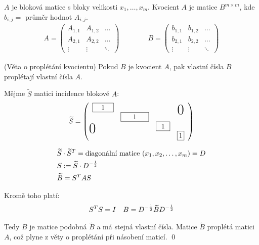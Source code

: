 \df $A$ je bloková matice s bloky velikosti $x_1, \dots, x_m$. Kvocient $A$ je matice $B^{m\times m}$, kde $b_{i,j} = $ průměr hodnot $A_{i,j}$.
\begin{align*}
	A = \left(\begin{matrix}
		A_{1,1} & A_{1,2} & \dots \\
		A_{2,1} & A_{2,2} & \dots \\
		\vdots & \vdots & \ddots 
		\end{matrix}\right)
	\qquad
	\qquad
	B = \left(\begin{matrix}
		b_{1,1} & b_{1,2} & \dots \\
		b_{2,1} & b_{2,2} & \dots \\
		\vdots & \vdots & \ddots 
		\end{matrix}\right)
\end{align*}

\vt (Věta o proplétání kvocientu) Pokud $B$ je kvocient $A$, pak vlastní čísla
$B$ proplétají vlastní čísla $A$.

\dk Mějme $\widetilde S$ matici incidence blokové $A$:
\begin{align*}
	\widetilde S = \left(\begin{array}{llll}
		\framebox[3em][c]{1} & & & \hfil\bigzero \\
		& \framebox[4em][c]{1} & & \\
		\bigzero & & \framebox[2em][c]{1} & \\
		& & & \framebox[1em][c]{1}
		\end{array}\right)
\end{align*}

\begin{align*}
	& \widetilde S\cdot\widetilde S^T = \text{diagonální matice } (x_1, x_2, \dots, x_m) = D \\
	& S := \widetilde S \cdot D^{-{1\over2}} \\
	& \widetilde B = S^TAS
\end{align*}

Kromě toho platí:
\begin{align*}
	& S^TS = I
	& B = D^{-{1\over2}}\widetilde BD^{-{1\over2}}
\end{align*}

Tedy $B$ je matice podobná $\widetilde B$ a má stejná vlastní čísla. Matice
$\widetilde B$ proplétá matici $A$, což plyne z věty o proplétání při násobení
maticí. \qed

